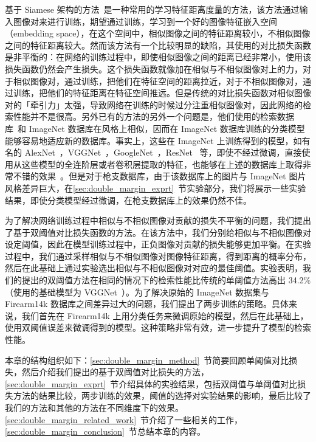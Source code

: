 基于 Siamese 架构的方法~\cite{Radenovic2016CNNIR,Chopra2005LearningAS,Bell2015LearningVS}是一种常用的学习特征距离度量的方法，该方法通过输入图像对来进行训练，期望通过训练，学习到一个好的图像特征嵌入空间（embedding space），在这个空间中，相似图像之间的特征距离较小，不相似图像之间的特征距离较大。然而该方法有一个比较明显的缺陷，其使用的对比损失函数是非平衡的：在网络的训练过程中，即使相似图像之间的距离已经非常小，使用该损失函数仍然会产生损失。这个损失函数就像加在相似与不相似图像对上的力，对于相似图像对，通过训练，把他们在特征空间的距离拉近，对于不相似图像对，通过训练，把他们的特征距离在特征空间推远。但是传统的对比损失函数对相似图像对的「牵引力」太强，导致网络在训练的时候过分注重相似图像对，因此网络的检索性能并不是很高。另外已有的方法的另外一个问题是，他们使用的检索数据库~\cite{Philbin2007ObjectRW,Philbin2008LostIQ}和 ImageNet 数据库在风格上相似，因而在 ImageNet 数据库训练的分类模型能够容易地适应新的数据库。事实上，这些在 ImageNet 上训练得到的模型，如有名的 AlexNet~\cite{Krizhevsky2012ImageNetCW}，VGGNet~\cite{Simonyan2014VeryDC}，GoogleNet~\cite{Szegedy2015GoingDW}，ResNet~\cite{He2016DeepRL} 等，即使不经过微调，直接使用从这些模型的全连阶层或者卷积层提取的特征，也能够在上述的数据库上取得非常不错的效果~\cite{Babenko2014NeuralCF,Babenko2015AggregatingLD,Tolias2015ParticularOR}。但是对于枪支数据库，由于该数据库上的图片与 ImageNet 图片风格差异巨大，在\ref{sec:double_margin_exprt}~节实验部分，我们将展示一些实验结果，即使分类模型经过微调，在枪支数据库上的效果仍然不佳。

为了解决网络训练过程中相似与不相似图像对贡献的损失不平衡的问题，我们提出了基于双阈值对比损失函数的方法。在该方法中，我们分别给相似与不相似图像对设定阈值，因此在模型训练过程中，正负图像对贡献的损失能够更加平衡。在实验过程中，我们通过采样相似与不相似图像对图像特征距离，得到距离的概率分布，然后在此基础上通过实验选出相似与不相似图像对对应的最佳阈值。实验表明，我们的提出的双阈值方法在相同的情况下的检索性能比传统的单阈值方法高出 34.2\% （使用的基础模型为 VGGNet~\cite{Simonyan2014VeryDC}）。为了解决原始的 ImageNet 数据集与 Firearm14k 数据库之间差异过大的问题，我们提出了两步训练的策略。具体来说，我们首先在 Firearm14k 上用分类任务来微调原始的模型，然后在此基础上，使用双阈值误差来微调得到的模型。这种策略非常有效，进一步提升了模型的检索性能。

本章的结构组织如下：\ref{sec:double_margin_method}~节简要回顾单阈值对比损失，然后介绍我们提出的基于双阈值对比损失的方法，\ref{sec:double_margin_exprt}~节介绍具体的实验结果，包括双阈值与单阈值对比损失方法的结果比较，两步训练的效果，阈值的选择对实验结果的影响，最后比较了我们的方法和其他的方法在不同维度下的效果。\ref{sec:double_margin_related_work}~节介绍了一些相关的工作，\ref{sec:double_margin_conclusion}~节总结本章的内容。

